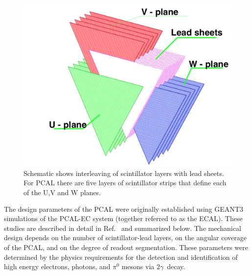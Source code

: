 \begin{figure}[hbt]
\centering
\includegraphics[width=0.95\columnwidth,keepaspectratio]{img/S3_2.png}
\caption[PCAL UVW Layers]{Schematic shows interleaving of scintillator layers with lead sheets.  For PCAL there are five layers of scintillator strips that define each of the U,V and W planes. }
\label{fig:S3_2}
\end{figure}

The design parameters of the PCAL were originally established using GEANT3 simulations of the PCAL-EC system
(together referred to as the ECAL). These studies are described in detail in Ref.~\cite{2007001} and
summarized below. The mechanical design depends on the number of scintillator-lead layers, on the angular
coverage of the PCAL, and on the degree of readout segmentation. These parameters were determined by
the physics requirements for the detection and identification of high energy electrons, photons, and $\pi^{0}$
mesons via $2\gamma$\ decay.

